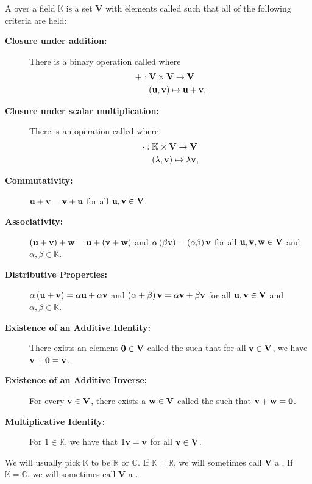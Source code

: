 \begin{dfn}\label{def:vector-space}
    A  over a field \( \mathbb{K} \) is a set \( \mathbf{V} \) with elements called  such that all of the following criteria are held:
\begin{description}
  \item[\textbf{Closure under addition:}] 
  There is a binary operation called  where 
  \begin{align*}
    + : \; &\mathbf{V} \times \mathbf{V} \to \mathbf{V} \\
    &(\vb{u}, \vb{v}) \mapsto \vb{u} + \vb{v},
  \end{align*}
    \item[\textbf{Closure under scalar multiplication:}] There is an operation called  where
    \begin{align*}
     \cdot : \; & \mathbb{K} \times \mathbf{V} \to \mathbf{V} \\
    &(\lambda, \vb{v}) \mapsto \lambda \vb{v},
  \end{align*}
  \item[\textbf{Commutativity:}] \( \vb{u} + \vb{v} = \vb{v} + \vb{u} \) for all \( \vb{u}, \vb{v} \in \mathbf{V} \). 
  \item[\textbf{Associativity:}] \( \left( \vb{u} + \vb{v} \right) + \vb{w} = \vb{u} + \left( \vb{v} + \vb{w} \right) \) and \( \alpha \left( \beta \vb{v}   \right)  = \left( \alpha \beta \right) \vb{v} \) for all \( \vb{u}, \vb{v},\vb{w} \in \mathbf{V} \) and \( \alpha, \beta \in \mathbb{K} \).
  \item[\textbf{Distributive Properties:}] \( \alpha \left( \vb{u} + \vb{v} \right) = \alpha \vb{u} + \alpha \vb{v} \) and \( \left( \alpha + \beta \right)\vb{v} = \alpha \vb{v} + \beta \vb{v} \) for all \( \vb{u}, \vb{v} \in \mathbf{V} \) and \( \alpha, \beta \in \mathbb{K} \).
  \item[\textbf{Existence of an Additive Identity:}] There exists an element  \( \vb{0} \in \mathbf{V} \) called the  such that for all \( \vb{v} \in \mathbf{V} \), we have \( \vb{v} + \vb{0} = \vb{v} \).
  \item[\textbf{Existence of an Additive Inverse:}] For every \( \vb{v} \in \mathbf{V} \), there exists a \( \vb{w} \in \mathbf{V} \) called the  such that \( \vb{v} + \vb{w} = \vb{0} \).
  \item[\textbf{Multiplicative Identity:}] For \( 1 \in \mathbb{K} \), we have that \( 1 \vb{v} = \vb{v} \) for all \( \vb{v} \in \mathbf{V} \).
\end{description}
We will usually pick \( \mathbb{K} \) to be \( \mathbb{R} \) or \( \mathbb{C} \). If \( \mathbb{K} = \mathbb{R} \), we will sometimes call \( \mathbf{V} \) a . If \( \mathbb{K} = \mathbb{C} \), we will sometimes call \( \mathbf{V} \) a . 

\end{dfn}

